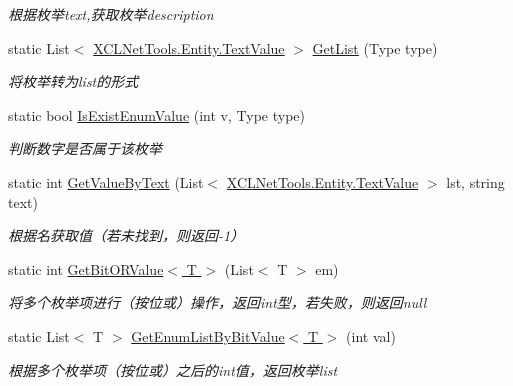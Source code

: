 \begin{DoxyCompactItemize}
\begin{DoxyCompactList}\small\item\em 根据枚举text,获取枚举description \end{DoxyCompactList}\item 
static List$<$ \hyperlink{class_x_c_l_net_tools_1_1_entity_1_1_text_value}{X\+C\+L\+Net\+Tools.\+Entity.\+Text\+Value} $>$ \hyperlink{class_x_c_l_net_tools_1_1_enum_1_1_enum_helper_a0f98e6348aacd00a6254794e6565c173}{Get\+List} (Type type)
\begin{DoxyCompactList}\small\item\em 将枚举转为list的形式 \end{DoxyCompactList}\item 
static bool \hyperlink{class_x_c_l_net_tools_1_1_enum_1_1_enum_helper_a364b52512aee90c0f2530745f4127047}{Is\+Exist\+Enum\+Value} (int v, Type type)
\begin{DoxyCompactList}\small\item\em 判断数字是否属于该枚举 \end{DoxyCompactList}\item 
static int \hyperlink{class_x_c_l_net_tools_1_1_enum_1_1_enum_helper_ab5d340064717d8cf3c9c6036d3770b1f}{Get\+Value\+By\+Text} (List$<$ \hyperlink{class_x_c_l_net_tools_1_1_entity_1_1_text_value}{X\+C\+L\+Net\+Tools.\+Entity.\+Text\+Value} $>$ lst, string text)
\begin{DoxyCompactList}\small\item\em 根据名获取值（若未找到，则返回-\/1） \end{DoxyCompactList}\item 
static int \hyperlink{class_x_c_l_net_tools_1_1_enum_1_1_enum_helper_a8ee641787655d2b4f06cb51486ea8be3}{Get\+Bit\+O\+R\+Value$<$ T $>$} (List$<$ T $>$ em)
\begin{DoxyCompactList}\small\item\em 将多个枚举项进行（按位或）操作，返回int型，若失败，则返回null \end{DoxyCompactList}\item 
static List$<$ T $>$ \hyperlink{class_x_c_l_net_tools_1_1_enum_1_1_enum_helper_a7023c3a9e2c46de0cdeed71bce2cfb6a}{Get\+Enum\+List\+By\+Bit\+Value$<$ T $>$} (int val)
\begin{DoxyCompactList}\small\item\em 根据多个枚举项（按位或）之后的int值，返回枚举list \end{DoxyCompactList}\end{DoxyCompactItemize}


